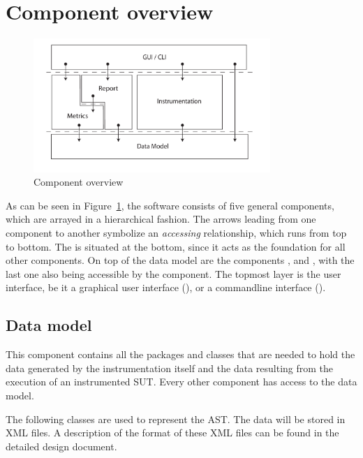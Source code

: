 \section{Component overview}\label{Component_Overview}

\begin{figure}[hbtp]
 \centering
 \includegraphics[width=0.8\textwidth]{images/Overview/components_layered.pdf}
 \caption{Component overview}
 \label{figure:Overview:component_diagram}
\end{figure}
As can be seen in Figure~\ref{figure:Overview:component_diagram}, the software consists of five general components, which are arrayed in a hierarchical fashion. The arrows leading from one component to another symbolize an \textit{accessing} relationship, which runs from top to bottom. The  is situated at the bottom, since it acts as the foundation for all other components. On top of the data model are the components ,  and , with the last one also being accessible by the  component. The topmost layer is the user interface, be it a graphical user interface (), or a commandline interface ().

\subsection{Data model}
This component contains all the packages and classes that are needed to hold the data generated by the instrumentation itself and the data resulting from the execution of an instrumented SUT. Every other component has access to the data model.


The following classes are used to represent the AST. The data will be stored in
XML files. A description of the format of these XML files can be found in
 the detailed design document.

